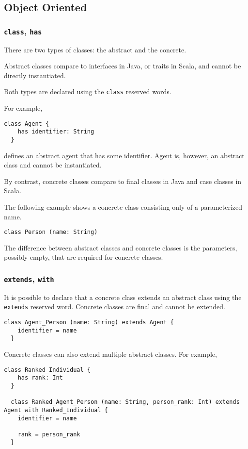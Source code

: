 \documentclass[12pt,a4paper]{article}
\newcommand{\srccode}[1]{\texttt{{#1}}}
\newcommand{\reservedWord}[1]{{\color{blue}\srccode{#1}}\xspace}
\newcommand{\sclass}{\reservedWord{class}}
\newcommand{\shas}{\reservedWord{has}}
\newcommand{\sextends}{\reservedWord{extends}}
\newcommand{\swith}{\reservedWord{with}}
\begin{document}
    \subsection{Object Oriented}

    \subsubsection{\sclass, \shas}

    There are two types of classes: the abstract and the concrete.

    Abstract classes compare to interfaces in Java, or traits in Scala, and cannot be directly instantiated.

    Both types are declared using the \sclass reserved words.

    For example,
    \begin{lstlisting}[label={lst:exampleAbstractClass}]
  class Agent {
    has identifier: String
  }
    \end{lstlisting}
    defines an abstract agent that has some identifier.
    Agent is, however, an abstract class and cannot be instantiated.

    By contrast, concrete classes compare to final classes in Java and case classes in Scala.

    The following example shows a concrete class consisting only of a parameterized name.
    \begin{lstlisting}[label={lst:exampleConcreteClass}]
  class Person (name: String)
    \end{lstlisting}

    The difference between abstract classes and concrete classes is the parameters, possibly empty, that are required for concrete classes.

    \subsubsection{\sextends, \swith}

    It is possible to declare that a concrete class extends an abstract class using the \sextends reserved word.
    Concrete classes are final and cannot be extended.

    \begin{lstlisting}[label={lst:exampleExtends}]
  class Agent_Person (name: String) extends Agent {
    identifier = name
  }
    \end{lstlisting}

    Concrete classes can also extend multiple abstract classes.
    For example,
    \begin{lstlisting}[label={lst:exampleWith}]
  class Ranked_Individual {
    has rank: Int
  }

  class Ranked_Agent_Person (name: String, person_rank: Int) extends Agent with Ranked_Individual {
    identifier = name

    rank = person_rank
  }
    \end{lstlisting}
\end{document}
